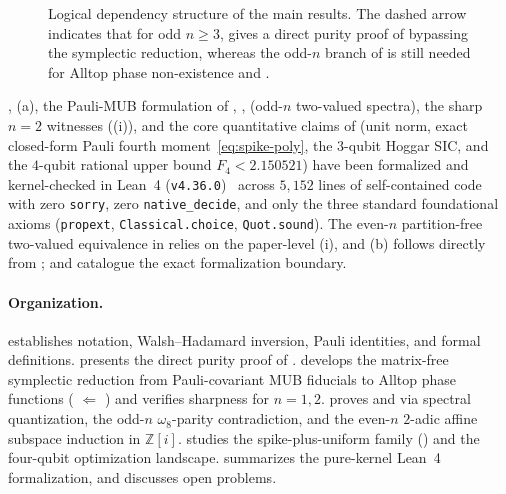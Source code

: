 \documentclass[11pt,a4paper]{article}
\theoremstyle{plain}
\theoremstyle{definition}
\theoremstyle{remark}
\newcommand{\Zi}{\mathbb{Z}[i]}
\numberwithin{equation}{section}
\begin{document}
\begin{figure}[htbp]
\begin{tikzpicture}
\end{tikzpicture}
\caption{Logical dependency structure of the main results. The dashed arrow indicates that for odd $n \ge 3$,  gives a direct purity proof of  bypassing the symplectic reduction, whereas the odd-$n$ branch of  is still needed for Alltop phase non-existence and .}\label{fig:proof-arch}
\end{figure}

, (a), the Pauli-MUB formulation of , ,  (odd-$n$ two-valued spectra), the sharp $n = 2$ witnesses ((i)), and the core quantitative claims of  (unit norm, exact closed-form Pauli fourth moment~\eqref{eq:spike-poly}, the $3$-qubit Hoggar SIC, and the $4$-qubit rational upper bound $F_4 < 2.150521$) have been formalized and kernel-checked in Lean~4 (\texttt{v4.36.0})~\cite{demoura2021lean4,mathlib2020lean} across $5{,}152$ lines of self-contained code with zero \texttt{sorry}, zero \texttt{native\_decide}, and only the three standard foundational axioms (\texttt{propext}, \texttt{Classical.choice}, \texttt{Quot.sound}). The even-$n$ partition-free two-valued equivalence in  relies on the paper-level (i), and (b) follows directly from ;  and  catalogue the exact formalization boundary.

\paragraph{Organization.}
 establishes notation, Walsh--Hadamard inversion, Pauli identities, and formal definitions.  presents the direct purity proof of .  develops the matrix-free symplectic reduction from Pauli-covariant MUB fiducials to Alltop phase functions ( $\Leftarrow$ ) and verifies sharpness for $n = 1, 2$.  proves  and  via spectral quantization, the odd-$n$ $\omega_8$-parity contradiction, and the even-$n$ $2$-adic affine subspace induction in $\Zi$.  studies the spike-plus-uniform family () and the four-qubit optimization landscape.  summarizes the pure-kernel Lean~4 formalization, and  discusses open problems.
\end{document}

